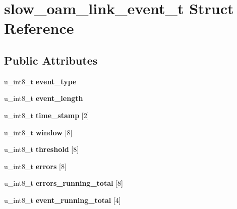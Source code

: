 \hypertarget{structslow__oam__link__event__t}{
\section{slow\_\-oam\_\-link\_\-event\_\-t Struct Reference}
\label{structslow__oam__link__event__t}
}
\subsection*{Public Attributes}
\begin{DoxyCompactItemize}
\item 
\hypertarget{structslow__oam__link__event__t_a8a6ca6d88ad018516854e31492bbcc03}{
u\_\-int8\_\-t {\bfseries event\_\-type}}
\label{structslow__oam__link__event__t_a8a6ca6d88ad018516854e31492bbcc03}

\item 
\hypertarget{structslow__oam__link__event__t_acb5fb9445073b983f5c06af1c17149f4}{
u\_\-int8\_\-t {\bfseries event\_\-length}}
\label{structslow__oam__link__event__t_acb5fb9445073b983f5c06af1c17149f4}

\item 
\hypertarget{structslow__oam__link__event__t_a4cbc256403ca5c4ecb974027a0646474}{
u\_\-int8\_\-t {\bfseries time\_\-stamp} \mbox{[}2\mbox{]}}
\label{structslow__oam__link__event__t_a4cbc256403ca5c4ecb974027a0646474}

\item 
\hypertarget{structslow__oam__link__event__t_a0b53fb8f6ab7710aa5400aa85bc978dc}{
u\_\-int8\_\-t {\bfseries window} \mbox{[}8\mbox{]}}
\label{structslow__oam__link__event__t_a0b53fb8f6ab7710aa5400aa85bc978dc}

\item 
\hypertarget{structslow__oam__link__event__t_a531ba0a0ede8a4bfc1054ed1933bdb8d}{
u\_\-int8\_\-t {\bfseries threshold} \mbox{[}8\mbox{]}}
\label{structslow__oam__link__event__t_a531ba0a0ede8a4bfc1054ed1933bdb8d}

\item 
\hypertarget{structslow__oam__link__event__t_aff644a300822221a0a5738a1a2a80356}{
u\_\-int8\_\-t {\bfseries errors} \mbox{[}8\mbox{]}}
\label{structslow__oam__link__event__t_aff644a300822221a0a5738a1a2a80356}

\item 
\hypertarget{structslow__oam__link__event__t_a1015e8e74befaf527b350e039199fcfd}{
u\_\-int8\_\-t {\bfseries errors\_\-running\_\-total} \mbox{[}8\mbox{]}}
\label{structslow__oam__link__event__t_a1015e8e74befaf527b350e039199fcfd}

\item 
\hypertarget{structslow__oam__link__event__t_afe8bfd617781381f8f3802194fd75620}{
u\_\-int8\_\-t {\bfseries event\_\-running\_\-total} \mbox{[}4\mbox{]}}
\label{structslow__oam__link__event__t_afe8bfd617781381f8f3802194fd75620}

\end{DoxyCompactItemize}


